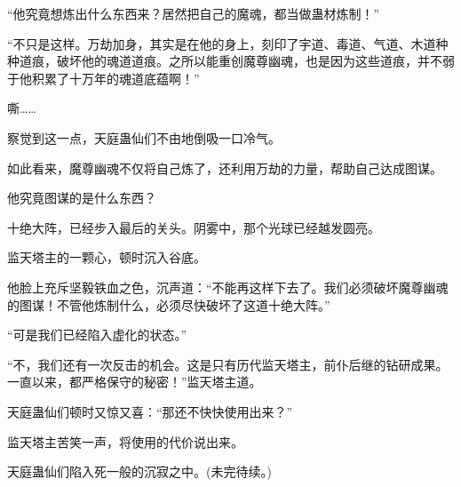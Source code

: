 \begin{this_body}
“他究竟想炼出什么东西来？居然把自己的魔魂，都当做蛊材炼制！”

“不只是这样。万劫加身，其实是在他的身上，刻印了宇道、毒道、气道、木道种种道痕，破坏他的魂道道痕。之所以能重创魔尊幽魂，也是因为这些道痕，并不弱于他积累了十万年的魂道底蕴啊！”

嘶……

察觉到这一点，天庭蛊仙们不由地倒吸一口冷气。

如此看来，魔尊幽魂不仅将自己炼了，还利用万劫的力量，帮助自己达成图谋。

他究竟图谋的是什么东西？

十绝大阵，已经步入最后的关头。阴雾中，那个光球已经越发圆亮。

监天塔主的一颗心，顿时沉入谷底。

他脸上充斥坚毅铁血之色，沉声道：“不能再这样下去了。我们必须破坏魔尊幽魂的图谋！不管他炼制什么，必须尽快破坏了这道十绝大阵。”

“可是我们已经陷入虚化的状态。”

“不，我们还有一次反击的机会。这是只有历代监天塔主，前仆后继的钻研成果。一直以来，都严格保守的秘密！”监天塔主道。

天庭蛊仙们顿时又惊又喜：“那还不快快使用出来？”

监天塔主苦笑一声，将使用的代价说出来。

天庭蛊仙们陷入死一般的沉寂之中。(未完待续。)

\end{this_body}

